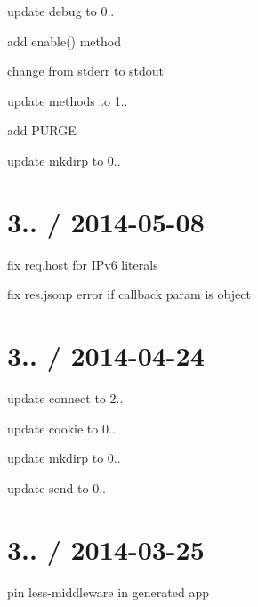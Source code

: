 \begin{DoxyItemize}
\begin{DoxyItemize}
\end{DoxyItemize}
\item update debug to 0..
\begin{DoxyItemize}
\item add {\ttfamily enable()} method
\item change from stderr to stdout
\end{DoxyItemize}
\item update methods to 1..
\begin{DoxyItemize}
\item add P\+U\+R\+G\+E
\end{DoxyItemize}
\item update mkdirp to 0..
\end{DoxyItemize}

\section*{3.. / 2014-\/05-\/08 }


\begin{DoxyItemize}
\item fix {\ttfamily req.\+host} for I\+Pv6 literals
\item fix {\ttfamily res.\+jsonp} error if callback param is object
\end{DoxyItemize}

\section*{3.. / 2014-\/04-\/24 }


\begin{DoxyItemize}
\item update connect to 2..
\item update cookie to 0..
\item update mkdirp to 0..
\item update send to 0..
\end{DoxyItemize}

\section*{3.. / 2014-\/03-\/25 }


\begin{DoxyItemize}
\item pin less-\/middleware in generated app
\end{DoxyItemize}

